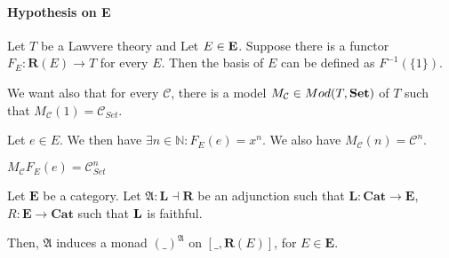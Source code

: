 \paragraph{Hypothesis on E}
Let $T$ be a Lawvere theory and
Let $E\in \bf E$.   Suppose there is a functor $F_E : \textbf{R}(E) \rightarrow T$ for every $E$. Then the basis of $E$ can be defined as $F^{-1}(\{1\})$.

We want also that for every $\mathcal{C}$, there is a model  $M_{\mathcal{C}}\in Mod(T,\bf Set)$ of $T$ such that $M_\mathcal{C}(1) = \mathcal{C}_{Set}$.

Let $e\in E$. We then have $\exists n \in \mathbb{N}  : F_E(e) = x^n$.  We also have $M_\mathcal{C}(n) = \mathcal{C}^n$.

$M_\mathcal{C}F_E(e) = \mathcal{C}_{Set}^n$


\begin{thm}
    Let $\textbf{E}$ be a category.
    Let $\mathfrak{A} : \textbf{L}\dashv \textbf{R}$ be an adjunction such that $\textbf{L} : \textbf{Cat} \rightarrow \textbf{E}$, $R : \textbf{E} \rightarrow \textbf{Cat}$  such that $\bf L$ is faithful.

    Then, $\mathfrak{A}$ induces a monad $(\_)^\mathfrak{A}$ on $[\_,\textbf{R}(E)]$, for $E \in \textbf{E}$.
\end{thm}

